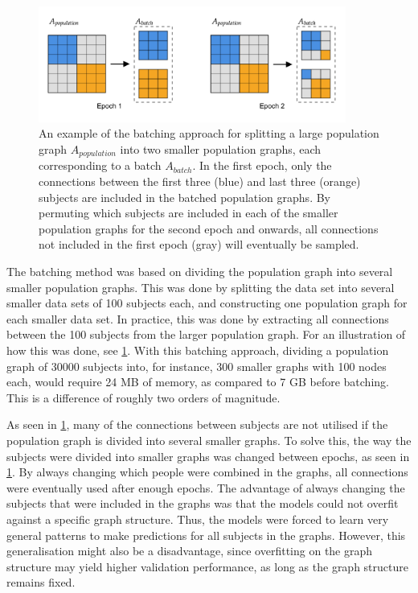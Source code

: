 \begin{figure}[!htbp]
    \centering
    \includegraphics[width=0.9\textwidth]{chapters/images_methods/batching.png}
    \caption{An example of the batching approach for splitting a large population graph $A_{population}$ into two smaller population graphs, each corresponding to a batch $A_{batch}$. In the first epoch, only the connections between the first three (blue) and last three (orange) subjects are included in the batched population graphs. By permuting which subjects are included in each of the smaller population graphs for the second epoch and onwards, all connections not included in the first epoch (gray) will eventually be sampled.}
    \label{fig:batches}
\end{figure}

The batching method was based on dividing the population graph into several smaller population graphs. This was done by splitting the data set into several smaller data sets of 100 subjects each, and constructing one population graph for each smaller data set. In practice, this was done by extracting all connections between the 100 subjects from the larger population graph. For an illustration of how this was done, see \cref{fig:batches}. With this batching approach, dividing a population graph of 30000 subjects into, for instance, 300 smaller graphs with 100 nodes each, would require 24 MB of memory, as compared to 7 GB before batching. This is a difference of roughly two orders of magnitude.

As seen in \cref{fig:batches}, many of the connections between subjects are not utilised if the population graph is divided into several smaller graphs. To solve this, the way the subjects were divided into smaller graphs was changed between epochs, as seen in \cref{fig:batches}. By always changing which people were combined in the graphs, all connections were eventually used after enough epochs. The advantage of always changing the subjects that were included in the graphs was that the models could not overfit against a specific graph structure. Thus, the models were forced to learn very general patterns to make predictions for all subjects in the graphs. However, this generalisation might also be a disadvantage, since overfitting on the graph structure may yield higher validation performance, as long as the graph structure remains fixed. 

